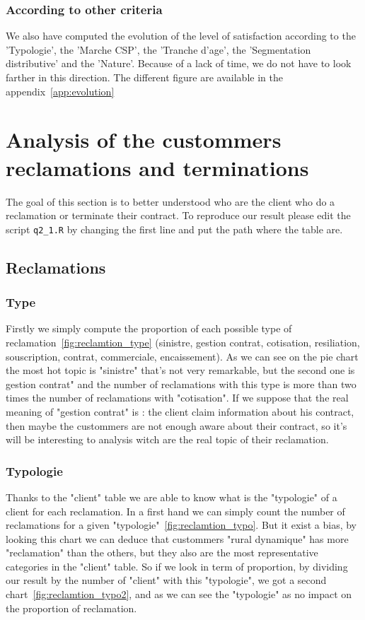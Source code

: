 \documentclass[a4paper, 11pt]{article}
\newcommand{\tw}[1]{\texttt{#1}}
\begin{document}
    \subsubsection{According to other criteria}
    We also have computed the evolution of the level of satisfaction according to the 'Typologie', the 'Marche CSP', the 'Tranche d'age', the 'Segmentation distributive' and the 'Nature'. Because of a lack of time, we do not have to look farther in this direction. The different figure are available in the appendix~\ref{app:evolution}
    
\section{Analysis of the custommers reclamations and terminations}
\label{sec:recl_anal}
	The goal of this section is to better understood who are the client who do a reclamation or terminate their contract. To reproduce our result please edit the script \tw{q2\_1.R} by changing the first line and put the path where the table are. 
    \subsection{Reclamations}
    
    	\subsubsection{Type}
    		Firstly we simply compute the proportion of each possible type of reclamation~\ref{fig:reclamtion_type} (sinistre, gestion contrat, cotisation, resiliation, souscription, contrat, commerciale, encaissement). As we can see on the pie chart the most hot topic is "sinistre" that's not very remarkable, but the second one is gestion contrat" and the number of reclamations with this type is more than two times the number of reclamations with "cotisation". If we suppose that the real meaning of "gestion contrat" is : the client claim information about his contract, then maybe the custommers are not enough aware about their contract, so it's will be interesting to analysis witch are the real topic of their reclamation. 
            
       \subsubsection{Typologie}
       		Thanks to the "client" table we are able to know what is the "typologie" of a client for each reclamation. In a first hand we can simply count the number of reclamations for a given "typologie"~\ref{fig:reclamtion_typo}. But it exist a bias, by looking this chart we can deduce that custommers "rural dynamique" has more "reclamation" than the others, but they also are the most representative categories in the "client" table. So if we look in term of proportion, by dividing our result by the number of "client" with this "typologie", we got a second chart~\ref{fig:reclamtion_typo2}, and as we can see the "typologie" as no impact on the proportion of reclamation.
            
\end{document}

